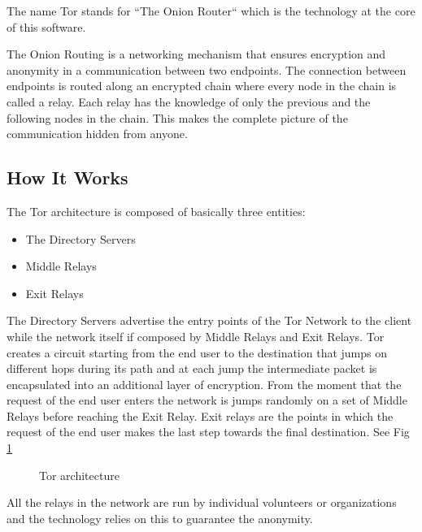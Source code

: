 \documentclass[runningheads,a4paper]{llncs}
\begin{document}
The name Tor stands for ``The Onion Router`` 
which is the technology at the core of this software.


The Onion Routing is a networking mechanism that ensures encryption and 
anonymity in a communication between two endpoints. The connection between 
endpoints is routed along an encrypted chain where every node in the chain is 
called a relay. Each relay has the knowledge of only the previous and the 
following nodes in the chain. This makes the complete picture of the communication hidden from anyone. \cite{CCDCOF}


\subsection{How It Works}
The Tor architecture is composed of basically three entities: 
\begin{itemize}
    \setlength\itemsep{1em}
    \item The Directory Servers
    \item Middle Relays
    \item Exit Relays
\end{itemize}
The Directory Servers advertise the entry points of the Tor Network to the client while the network
itself if composed by Middle Relays and Exit Relays. 
Tor creates a circuit starting from the end user to the destination that jumps on 
different hops during its path and at each jump the intermediate packet is encapsulated 
into an additional layer of encryption. From the moment that the request of the end user 
enters the network is jumps randomly on a set of Middle Relays before reaching the Exit Relay. 
Exit relays are the points in which the request of the end user makes the last step towards 
the final destination. See Fig \ref{fig:fig_tor_arch}

\begin{figure}[]
        \caption{ Tor architecture}
        \label{fig:fig_tor_arch}
\end{figure}

All the relays in the network are run by individual volunteers or organizations and the technology 
relies on this to guarantee the anonymity.
\end{document}
